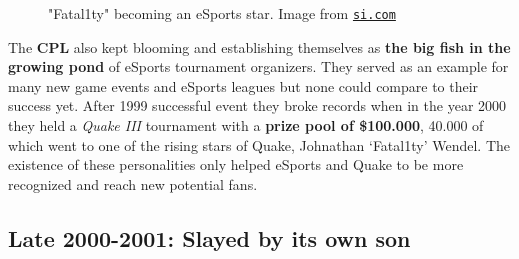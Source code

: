 \begin{figure}
	\begin{center}
		
		\caption{"Fatal1ty" becoming an eSports star. Image from \href{https://www.si.com/more-sports/2016/06/30/fatal1ty-esports-professional-gaming-prize-money-motherboards}{\nolinkurl{si.com}}}
	\end{center}
\end{figure}

The \textbf{CPL} also kept blooming and establishing themselves as \textbf{the big fish in the growing pond} of eSports tournament organizers. They served as an example for many new game events and eSports leagues but none could compare to their success yet. After 1999 successful event they broke records when in the year 2000 they held a \textit{Quake III} tournament with a \textbf{prize pool of \$100.000}, 40.000 of which went to one of the rising stars of Quake, Johnathan ‘Fatal1ty’ Wendel. The existence of these personalities only helped eSports and Quake to be more recognized and reach new potential fans.


\subsection{Late 2000-2001: Slayed by its own son}



